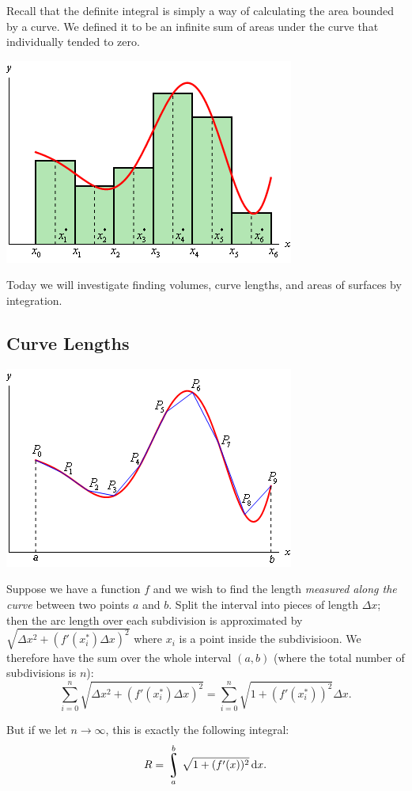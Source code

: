 


Recall that the definite integral is simply a way of calculating the area bounded by a curve. We defined
it to be an infinite sum of areas under the curve that individually tended to zero.
\begin{center}
  \includegraphics[width=0.4\linewidth]{approx-rectangles}
\end{center}

Today we will investigate finding volumes, curve lengths, and areas of surfaces by integration.

\subsection*{Curve Lengths}
\begin{center}
  \includegraphics[width=0.4\linewidth]{arclength}
\end{center}
Suppose we have a function $ f $ and we wish to find the length \textit{measured along the curve}
between two points $ a $ and $ b $. Split the interval into pieces of length $ \Delta x $; then the
arc length over each subdivision is approximated by $ \sqrt{\Delta x^2 + (f'(x_i^\ast) \Delta x)^2 } $ where $ x_i $ is
a point inside the subdivisioon. We therefore have the sum over the whole interval $ (a,b) $ (where the total number
of subdivisions is $ n $):
\begin{displaymath}
  \sum_{i = 0}^n \sqrt{\Delta x^2 + (f'(x_i^\ast) \Delta x)^2 } = \sum_{i = 0}^n \sqrt{1 + (f'(x_i^\ast))^2} \Delta x.
\end{displaymath}

But if we let $ n \to \infty $, this is exactly the following integral:
\begin{displaymath}
  R = \rint^b_a \sqrt{1 + (f'(x))^2} \dif{x}.
\end{displaymath}

